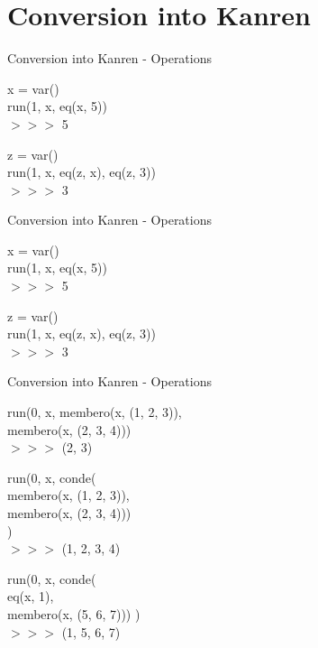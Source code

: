 \documentclass{beamer}
\begin{document}
\section{Conversion into Kanren}


\begin{frame}{Conversion into Kanren - Operations}
\color{black}
    \begin{center}
        x = var()\\
        run(1, x, eq(x, 5))\\
\color{red}
        $>>>$ 5
    \end{center}
\color{gray}
    \begin{center}
        z = var()\\
        run(1, x, eq(z, x), eq(z, 3))\\
        $>>>$ 3
    \end{center}
\end{frame}

\begin{frame}{Conversion into Kanren - Operations}
\color{gray}
    \begin{center}
        x = var()\\
        run(1, x, eq(x, 5))\\
\color{gray}
        $>>>$ 5
    \end{center}
\color{black}
    \begin{center}
        z = var()\\
        run(1, x, eq(z, x), eq(z, 3))\\
        \color{red}
        $>>>$ 3
    \end{center}
\end{frame}

\begin{frame}{Conversion into Kanren - Operations}
    \begin{center}
        run(0, x, membero(x, (1, 2, 3)),\\ membero(x, (2, 3, 4)))\\
        \color{red} $>>>$ (2, 3)
    \end{center}
    \color{gray}
    \begin{center}
        run(0, x, conde(\\
        membero(x, (1, 2, 3)),\\ 
        membero(x, (2, 3, 4)))\\
        )\\
        $>>>$ (1, 2, 3, 4)
    \end{center}
    \color{gray}
    \begin{center}
        run(0, x, conde(\\  
        eq(x, 1),\\   
        membero(x, (5, 6, 7)))
        )\\  
        $>>>$ (1, 5, 6, 7)
    \end{center}
\end{frame}
\end{document}
